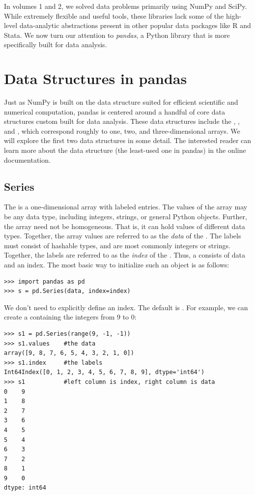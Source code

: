 \label{lab:pandas1}

In volumes 1 and 2, we solved data problems primarily using NumPy and SciPy.
While extremely flexible and useful tools, these libraries lack some of the high-level 
data-analytic abstractions present in other popular data packages like R and Stata.
We now turn our attention to \emph{pandas}, a Python library that is more specifically built
for data analysis.

\section*{Data Structures in pandas}
Just as NumPy is built on the  data structure suited for efficient scientific
and numerical computation, pandas is centered around a handful of core data structures
custom built for data analysis. These data structures include the , ,
and , which correspond roughly to one, two, and three-dimensional arrays.
We will explore the first two data structures in some detail.
The interested reader can learn more about the  data structure (the least-used one in pandas) in the online documentation.

\subsection*{Series}
The  is a one-dimensional array with labeled entries. The values of the array may be
any data type, including integers, strings, or general Python objects. Further, the array
need not be homogeneous. That is, it can hold values of different data types. Together,
the array values are referred to as the \emph{data} of the .
The labels must consist of hashable types, and are most commonly integers or strings.
Together, the labels are referred to as the \emph{index} of the .
Thus, a  consists of data and an index. The most basic way to initialize such an object
is as follows:
\begin{lstlisting}
>>> import pandas as pd
>>> s = pd.Series(data, index=index)
\end{lstlisting}
We don't need to explicitly define an index. The default is .
For example, we can create a  containing the integers from 9 to 0:
\begin{lstlisting}
>>> s1 = pd.Series(range(9, -1, -1))
>>> s1.values    #the data
array([9, 8, 7, 6, 5, 4, 3, 2, 1, 0])
>>> s1.index     #the labels
Int64Index([0, 1, 2, 3, 4, 5, 6, 7, 8, 9], dtype='int64')
>>> s1           #left column is index, right column is data
0    9
1    8
2    7
3    6
4    5
5    4
6    3
7    2
8    1
9    0
dtype: int64
\end{lstlisting}

